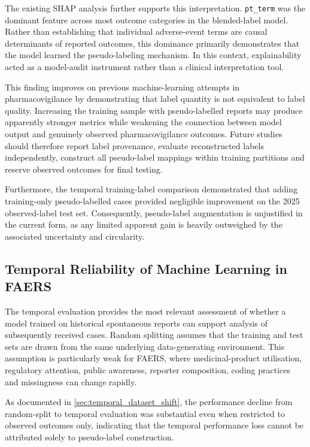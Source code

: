 \documentclass[10pt]{article}
\begin{document}
The existing SHAP analysis further supports this interpretation. \texttt{pt\_term} was the dominant feature across most outcome categories in the blended-label model. Rather than establishing that individual adverse-event terms are causal determinants of reported outcomes, this dominance primarily demonstrates that the model learned the pseudo-labeling mechanism. In this context, explainability acted as a model-audit instrument rather than a clinical interpretation tool.

This finding improves on previous machine-learning attempts in pharmacovigilance by demonstrating that label quantity is not equivalent to label quality. Increasing the training sample with pseudo-labelled reports may produce apparently stronger metrics while weakening the connection between model output and genuinely observed pharmacovigilance outcomes. Future studies should therefore report label provenance, evaluate reconstructed labels independently, construct all pseudo-label mappings within training partitions and reserve observed outcomes for final testing.

Furthermore, the temporal training-label comparison demonstrated that adding training-only pseudo-labelled cases provided negligible improvement on the 2025 observed-label test set. Consequently, pseudo-label augmentation is unjustified in the current form, as any limited apparent gain is heavily outweighed by the associated uncertainty and circularity.

\subsection{Temporal Reliability of Machine Learning in FAERS}
The temporal evaluation provides the most relevant assessment of whether a model trained on historical spontaneous reports can support analysis of subsequently received cases. Random splitting assumes that the training and test sets are drawn from the same underlying data-generating environment. This assumption is particularly weak for FAERS, where medicinal-product utilisation, regulatory attention, public awareness, reporter composition, coding practices and missingness can change rapidly.

As documented in \cref{sec:temporal_dataset_shift}, the performance decline from random-split to temporal evaluation was substantial even when restricted to observed outcomes only, indicating that the temporal performance loss cannot be attributed solely to pseudo-label construction.
\end{document}
